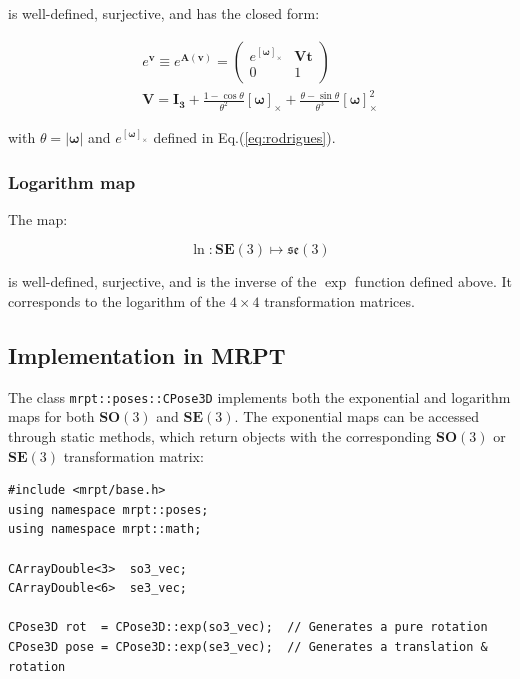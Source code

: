 \documentclass[a4paper,11pt]{report}
\newcommand{\W}{{\bm{\omega}}}
\begin{document}
\noindent is well-defined, surjective, and has the closed form:

\begin{eqnarray}
  e^ { \mathbf{v} } \equiv  e^ { \mathbf{A}(\mathbf{v}) } =
\left(
\begin{array}{cc}
  e^{[\W]_\times} & \mathbf{V} \mathbf{t} \\
   0 & 1
\end{array}
\right)
\\
\mathbf{V} = \mathbf{I_3}
+ \frac{1-\cos \theta}{\theta^2} [\W]_\times 
+ \frac{\theta- \sin \theta}{\theta^3} [\W]^2_\times
\end{eqnarray}

\noindent with $\theta = |\W|$ and $e^{[\W]_\times}$ 
defined in Eq.(\ref{eq:rodrigues}).



\subsubsection{Logarithm map}

The map:

\begin{equation}
  \ln: \mathbf{SE}(3) \mapsto \mathfrak{se}(3)
\end{equation}

\noindent is well-defined, surjective, and is the inverse of the $\exp$ function defined above. 
It corresponds to the logarithm of the $4\times 4$ transformation matrices.



\subsection{Implementation in MRPT}

The class \texttt{mrpt::poses::CPose3D} implements both the exponential and logarithm
maps for both $\mathbf{SO}(3)$ and $\mathbf{SE}(3)$.
The exponential maps can be accessed through static methods, which return objects 
with the corresponding $\mathbf{SO}(3)$ or $\mathbf{SE}(3)$ transformation matrix:

\begin{lstlisting}
#include <mrpt/base.h> 
using namespace mrpt::poses; 
using namespace mrpt::math;

CArrayDouble<3>  so3_vec; 
CArrayDouble<6>  se3_vec; 

CPose3D rot  = CPose3D::exp(so3_vec);  // Generates a pure rotation 
CPose3D pose = CPose3D::exp(se3_vec);  // Generates a translation & rotation
\end{lstlisting}
\end{document}
